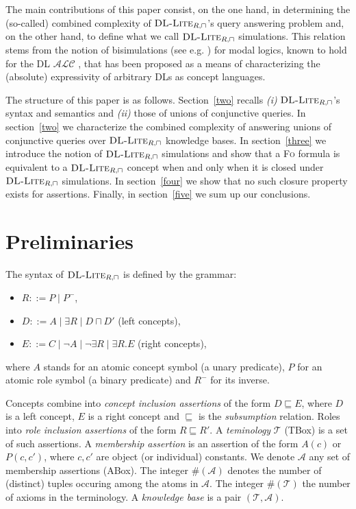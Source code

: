 \documentclass[11pt]{llncs}
\newcommand{\logic}[1]{\textsc{#1}\xspace}
\newcommand{\FOL}{\logic{Fo}}
\newcommand{\g}[1]{\logic{#1}}
\newcommand{\tup}[1]{(#1)}
\newcommand{\card}[1]{\#(#1)}
\newcommand{\f}[1]{\mathcal{#1}}
\newcommand{\dlliterc}{\g{DL-Lite}_{R,\sqcap}\xspace}
\begin{document}
The main contributions of this paper consist, on the one hand,
in determining the (so-called) combined complexity of $\dlliterc$'s
query answering problem and, on the other hand,
to define what
we call $\dlliterc$ simulations.
This relation stems from the notion of bisimulations
(see e.g. \cite{vanBenthem2006}) for modal logics, known
to hold for the DL $\f{ALC}$ \cite{DLHandbook}, that
has been proposed \cite{deRijke1997} as a means
of characterizing the (absolute)
expressivity of arbitrary DLs as concept languages.

The structure of this paper is as follows.
Section~\ref{two} recalls \textit{(i)} $\dlliterc$'s syntax
and semantics and \textit{(ii)} those of unions of conjunctive queries.
In section~\ref{two} we characterize the 
combined complexity of answering unions of conjunctive queries
over $\dlliterc$ knowledge bases.
In section~\ref{three} we introduce the notion
of $\dlliterc$ simulations
and show that a \FOL formula is equivalent to a $\dlliterc$
concept when and only when it is closed under $\dlliterc$ simulations.
In section~\ref{four} we show that no such closure property
exists for assertions.
Finally, in section~\ref{five} we sum up our conclusions.

\section{Preliminaries}\label{one}


The syntax of
$\dlliterc$ is defined by the grammar:
\begin{itemize}
\item $R ::= P \mid P^-$,
\item $D ::= A \mid \exists R \mid D \sqcap D'$ (left concepts),
\item $E ::= C \mid \neg A \mid \neg \exists R \mid \exists R . E$ (right concepts),
\end{itemize}
where $A$ stands for an atomic concept symbol (a unary predicate),
$P$ for an atomic role symbol (a binary predicate) and $R^-$ for its inverse.

Concepts combine into {\em concept inclusion assertions} of the form
$D \sqsubseteq E$, where $D$ is a left concept, $E$ is a right concept
and $\sqsubseteq$ is the {\em subsumption} relation. Roles into
{\em role inclusion assertions} of the form $R \sqsubseteq R'$.
A {\em teminology} $\f{T}$ (TBox) is a set of such assertions.
A {\em membership assertion} is an assertion of the form 
$A(c)$ or $P(c,c')$, where $c,c'$ are object (or individual) constants.
We denote $\f{A}$ any set of membership assertions (ABox).
The integer
$\card{\f{A}}$ denotes the number of (distinct)
tuples occuring among the atoms in $\f{A}$.
The integer $\card{\f{T}}$ the number of axioms in the terminology.
A {\em knowledge base} is a pair $\tup{\f{T},\f{A}}$.
\end{document}

